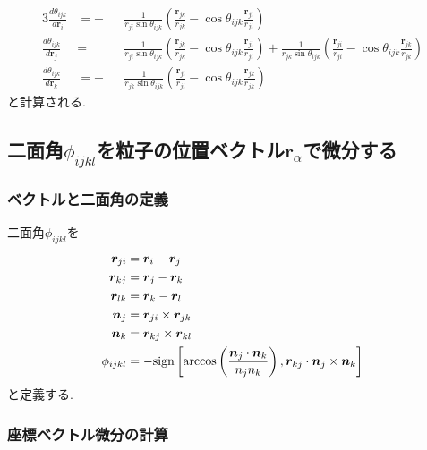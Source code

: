 \begin{alignat}{3}
   \frac{d \theta_{ijk}}{d \bm{r}_{i}}
   &=
   -&&
   \frac{1}{r_{ji} \sin\theta_{ijk}}
   \left(
            \frac{\bm{r}_{jk}}{r_{jk}}
          - \cos\theta_{ijk} \frac{\bm{r}_{ji}}{r_{ji}}
   \right)
   \label{Eq:dtheta_dri}
   \\
   \frac{d \theta_{ijk}}{d \bm{r}_{j}}
   &=&&
   \frac{1}{r_{ji} \sin\theta_{ijk}}
   \left(
            \frac{\bm{r}_{jk}}{r_{jk}}
          - \cos\theta_{ijk} \frac{\bm{r}_{ji}}{r_{ji}}
   \right)
   +
   \frac{1}{r_{jk} \sin\theta_{ijk}}
   \left(
            \frac{\bm{r}_{ji}}{r_{ji}}
          - \cos\theta_{ijk} \frac{\bm{r}_{jk}}{r_{jk}}
   \right)
   \label{Eq:dtheta_drj}
   \\
   \frac{d \theta_{ijk}}{d \bm{r}_{k}}
   &=
   -&&
   \frac{1}{r_{jk} \sin\theta_{ijk}}
   \left(
           \frac{\bm{r}_{ji}}{r_{ji}}
         - \cos\theta_{ijk} \frac{\bm{r}_{jk}}{r_{jk}}
   \right)
   \label{Eq:dtheta_drk}
\end{alignat}
と計算される. 

\subsection{二面角$\phi_{ijkl}$を粒子の位置ベクトル$\bm{r}_{\alpha}$で微分する}
\subsubsection{ベクトルと二面角の定義}
二面角$\phi_{ijkl}$を
\begin{alignat}{1}
   \bm{r}_{ji} &= \bm{r}_{i} - \bm{r}_{j}
   \notag \\
   \bm{r}_{kj} &= \bm{r}_{j} - \bm{r}_{k}
   \notag \\
   \bm{r}_{lk} &= \bm{r}_{k} - \bm{r}_{l}
   \notag \\
   \bm{n}_{j}  &= \bm{r}_{ji} \times \bm{r}_{jk}
   \notag \\
   \bm{n}_{k}  &= \bm{r}_{kj} \times \bm{r}_{kl}
   \notag
   \\
   \phi_{ijkl} &=
   - \mathrm{sign}
     \left[
           \arccos \left( \frac{\bm{n}_{j} \cdot \bm{n}_{k}}{n_{j} n_{k}}\right),
           \bm{r}_{kj} \cdot \bm{n}_{j} \times \bm{n}_{k}
     \right]
   \notag
\end{alignat}
と定義する.

\subsubsection{座標ベクトル微分の計算}

